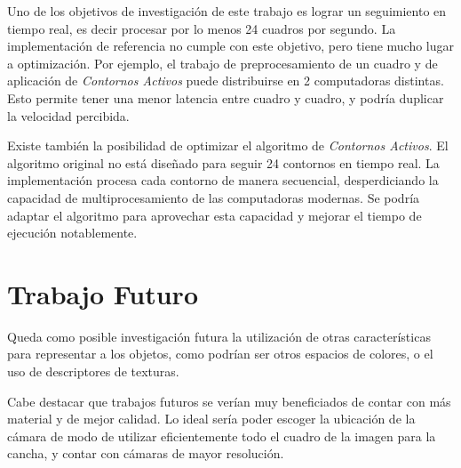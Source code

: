 Uno de los objetivos de investigación de este trabajo es lograr un seguimiento en
tiempo real, es decir procesar por lo menos 24 cuadros por segundo. La
implementación de referencia no cumple con este objetivo, pero tiene mucho
lugar a optimización.  Por ejemplo, el trabajo de preprocesamiento de un cuadro
y de aplicación de \textit{Contornos Activos} puede distribuirse en 2
computadoras distintas. Esto permite tener una menor latencia entre cuadro y
cuadro, y podría duplicar la velocidad percibida.

Existe también la posibilidad de optimizar el algoritmo de \textit{Contornos
Activos}. El algoritmo original no está diseñado para seguir 24 contornos en
tiempo real. La implementación procesa cada contorno de manera secuencial,
desperdiciando la capacidad de multiprocesamiento de las computadoras modernas.
Se podría adaptar el algoritmo para aprovechar esta capacidad y mejorar el
tiempo de ejecución notablemente.

\section{Trabajo Futuro}

Queda como posible investigación futura la utilización de otras características
para representar a los objetos, como podrían ser otros espacios de colores, o
el uso de descriptores de texturas.

Cabe destacar que trabajos futuros se verían muy beneficiados de contar con más
material y de mejor calidad. Lo ideal sería poder escoger la ubicación de la
cámara de modo de utilizar eficientemente todo el cuadro de la imagen para la
cancha, y contar con cámaras de mayor resolución.
